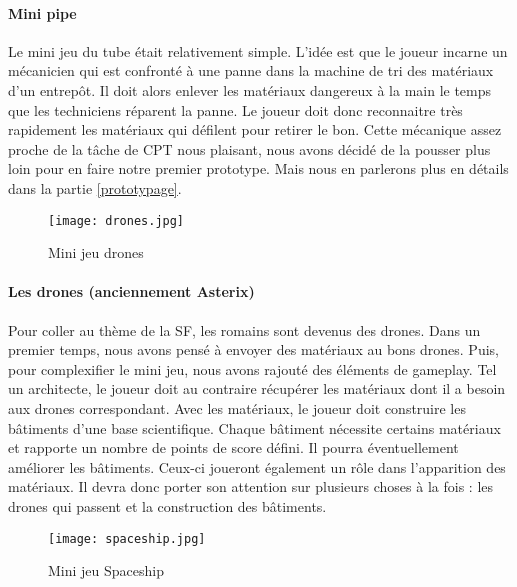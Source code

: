 \paragraph{Mini pipe}Le mini jeu du tube était relativement simple. L'idée est que le joueur incarne un mécanicien qui est confronté à une panne dans la machine de tri des matériaux d'un
entrepôt. Il doit alors enlever les matériaux dangereux à la main le temps que les techniciens réparent la panne. Le joueur doit donc reconnaitre très rapidement les matériaux qui
défilent pour retirer le bon. Cette mécanique assez proche de la tâche de CPT nous plaisant, nous avons décidé de la pousser plus loin pour en faire notre premier prototype. Mais nous
en parlerons plus en détails dans la partie \ref{prototypage}.

\begin{wrapfigure}[11]{l}{6cm}
    \vspace{-20pt}
    \begin{center}
    \texttt{[image: drones.jpg]}
    \end{center}
    \captionsetup{labelformat=simpleNumber}
    \caption{Mini jeu drones}
\label{Drones}
\end{wrapfigure}

\paragraph{Les drones (anciennement Asterix)} Pour coller au thème de la \gls{SF}, les romains sont devenus des drones. Dans un premier temps, nous avons pensé à envoyer des matériaux
au bons drones. Puis, pour complexifier le mini jeu, nous avons rajouté des éléments de gameplay. Tel un architecte, le joueur doit au contraire récupérer les matériaux dont
il a besoin aux drones correspondant. Avec les matériaux, le joueur doit construire les bâtiments d'une base scientifique. Chaque bâtiment nécessite certains matériaux et rapporte un
nombre de points de score défini. Il pourra éventuellement améliorer les bâtiments. Ceux-ci joueront également un rôle dans l'apparition des matériaux. Il devra donc porter son
attention sur plusieurs choses à la fois : les drones qui passent et la construction des bâtiments.

\begin{wrapfigure}[17]{l}{6cm}
    \vspace{-20pt}
    \begin{center}
    \texttt{[image: spaceship.jpg]}
    \end{center}
    \captionsetup{labelformat=simpleNumber}
    \caption{Mini jeu Spaceship}
\label{Spaceship}
\end{wrapfigure}

